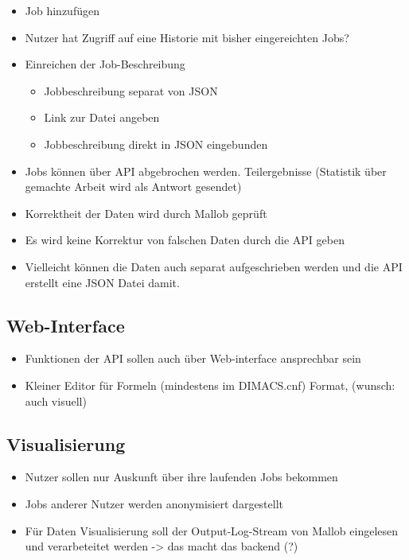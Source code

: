 \documentclass{article}
\begin{document}
\begin{itemize}
    \item Job hinzufügen
    \item Nutzer hat Zugriff auf eine Historie mit bisher eingereichten Jobs?
    
    
    \item Einreichen der Job-Beschreibung
    \begin{itemize}
        \item Jobbeschreibung separat von JSON
        \item Link zur Datei angeben
        \item Jobbeschreibung direkt in JSON eingebunden
    \end{itemize}
    
    \item Jobs können über API abgebrochen werden. Teilergebnisse (Statistik über gemachte Arbeit wird als Antwort gesendet)
    
    \item Korrektheit der Daten wird durch Mallob geprüft
    
    \item Es wird keine Korrektur von falschen Daten durch die API geben
    
    \item Vielleicht können die Daten auch separat aufgeschrieben werden und 
    die API erstellt eine JSON Datei damit.
\end{itemize}

\subsection{Web-Interface}

\begin{itemize}
    \item Funktionen der API sollen auch über Web-interface ansprechbar sein
    \item Kleiner Editor für Formeln (mindestens im DIMACS.cnf) Format, (wunsch: auch visuell)
\end{itemize}

\subsection{Visualisierung}

\begin{itemize}
    \item Nutzer sollen nur Auskunft über ihre laufenden Jobs bekommen 
    \item Jobs anderer Nutzer werden anonymisiert dargestellt
    \item Für Daten Visualisierung soll der Output-Log-Stream von Mallob eingelesen und verarbeteitet werden -> das macht das backend (?)
\end{itemize}
\end{document}
